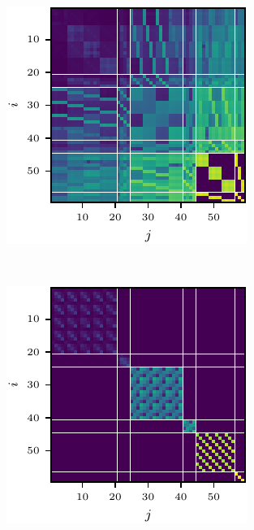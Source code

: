 \begin{figure}
\begin{minipage}[t]{0.495\linewidth}
    \includegraphics[width=\linewidth]{../kfs/plots/synthetic_rvec_hessian.pdf}
  \end{minipage}
  \\
  \begin{minipage}[t]{0.495\linewidth}
    \centering
    \includegraphics[width=\linewidth]{../kfs/plots/synthetic_cvec_hessian_bda.pdf}

\end{minipage}
\end{figure}
